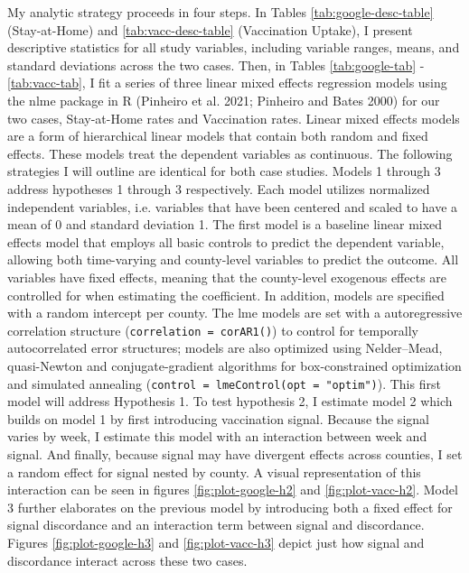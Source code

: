 My analytic strategy proceeds in four steps. In Tables
\ref{tab:google-desc-table} (Stay-at-Home) and \ref{tab:vacc-desc-table}
(Vaccination Uptake), I present descriptive statistics for all study variables,
including variable ranges, means, and standard deviations across the two cases.
Then, in Tables \ref{tab:google-tab} - \ref{tab:vacc-tab}, I fit a series of
three linear mixed effects regression models using the nlme package in R
(Pinheiro et al. 2021; Pinheiro and Bates 2000) for our two cases, Stay-at-Home rates and
Vaccination rates. Linear mixed effects models are a form of hierarchical linear
models that contain both random and fixed effects. These models treat the
dependent variables as continuous. The following strategies I will outline are
identical for both case studies. Models 1 through 3 address hypotheses 1 through
3 respectively. Each model utilizes normalized independent variables, i.e.
variables that have been centered and scaled to have a mean of 0 and standard
deviation 1. The first model is a baseline linear mixed effects model that
employs all basic controls to predict the dependent variable, allowing both
time-varying and county-level variables to predict the outcome. All variables
have fixed effects, meaning that the county-level exogenous effects are
controlled for when estimating the coefficient. In addition, models are
specified with a random intercept per county. The lme models are set with a
autoregressive correlation structure (\texttt{correlation\ =\ corAR1()}) to control for
temporally autocorrelated error structures; models are also optimized using
Nelder--Mead, quasi-Newton and conjugate-gradient algorithms for box-constrained
optimization and simulated annealing (\texttt{control\ =\ lmeControl(opt\ =\ "optim")}).
This first model will address Hypothesis 1. To test hypothesis 2, I estimate
model 2 which builds on model 1 by first introducing vaccination signal. Because
the signal varies by week, I estimate this model with an interaction between
week and signal. And finally, because signal may have divergent effects across
counties, I set a random effect for signal nested by county. A visual
representation of this interaction can be seen in figures
\ref{fig:plot-google-h2} and \ref{fig:plot-vacc-h2}. Model 3 further
elaborates on the previous model by introducing both a fixed effect for signal
discordance and an interaction term between signal and discordance. Figures
\ref{fig:plot-google-h3} and \ref{fig:plot-vacc-h3} depict just how signal and
discordance interact across these two cases.

